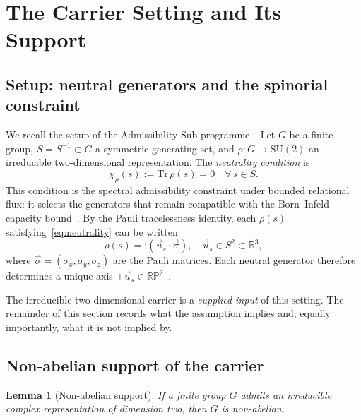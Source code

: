 \documentclass[11pt,a4paper]{article}
\newtheorem{lemma}[theorem]{Lemma}
\newcommand{\SU}{\mathrm{SU}}
\begin{document}
  \section{The Carrier Setting and Its Support}
  \label{sec:exclusion}

  \subsection{Setup: neutral generators and the spinorial constraint}
    \label{ssec:neutral-setup}

    We recall the setup of the Admissibility Sub-programme~\cite{Beau2026a1,Beau2026a2}.
    Let $G$ be a finite group, $S = S^{-1} \subset G$ a symmetric generating set, and
    $\rho \colon G \to \SU(2)$ an irreducible two-dimensional representation.
    The \emph{neutrality condition} is
    \begin{equation}
      \label{eq:neutrality}
      \chi_{\rho}(s) := \mathrm{Tr}\,\rho(s) = 0 \quad \forall\, s \in S.
    \end{equation}
    This condition is the spectral admissibility constraint under bounded relational flux:
    it selects the generators that remain compatible with the Born--Infeld capacity
    bound~\cite{Beau2026a1,Beau2026a2}.
    By the Pauli tracelessness identity, each $\rho(s)$ satisfying~\eqref{eq:neutrality}
    can be written
    \begin{equation}
      \label{eq:pauli-axis}
      \rho(s) = \mathrm{i}(\vec{u}_{s} \cdot \vec{\sigma}), \quad
      \vec{u}_{s} \in S^{2} \subset \mathbb{R}^{3},
    \end{equation}
    where $\vec{\sigma} = (\sigma_{x}, \sigma_{y}, \sigma_{z})$ are the Pauli matrices.
    Each neutral generator therefore determines a unique axis $\pm \vec{u}_{s} \in
  \mathbb{RP}^{2}$~\cite{Beau2026a3}.

    The irreducible two-dimensional carrier is a \emph{supplied input} of this setting.
    The remainder of this section records what the assumption implies and, equally
    importantly, what it is not implied by.

  \subsection{Non-abelian support of the carrier}
    \label{ssec:abelian-exclusion}

    \begin{lemma}[Non-abelian support]
      \label{lem:abelian-exclusion}
      If a finite group $G$ admits an irreducible complex representation of dimension two,
      then $G$ is non-abelian.
    \end{lemma}
\end{document}
